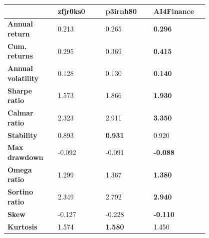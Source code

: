 \documentclass[../xlapes02]{subfiles}
\begin{document}
    \begin{table}[h!]
        \centering
        {\footnotesize
            \begin{tabular}{*{4}{|m{0.20\linewidth}|}}
                \toprule
                & \bfseries zfjr0ks0                   & \bfseries p3irnh80                    & \bfseries AI4Finance \\[0.5cm]
                \midrule
                \bfseries Annual return       & 0.213                                & 0.265                                 & \color[HTML]{00F000} \bfseries 0.296 \\[0.5cm]
                \bfseries Cum. returns        & 0.295                                & 0.369                                 & \color[HTML]{00F000} \bfseries 0.415 \\[0.5cm]
                \bfseries Annual volatility   & 0.128                                & 0.130                                 & \color[HTML]{00F000} \bfseries 0.140 \\[0.5cm]
                \bfseries Sharpe ratio        & 1.573                                & 1.866                                 & \color[HTML]{00F000} \bfseries 1.930 \\[0.5cm]
                \bfseries Calmar ratio        & 2.323                                & 2.911                                 & \color[HTML]{00F000} \bfseries 3.350 \\[0.5cm]
                \bfseries Stability           & 0.893                                & \color[HTML]{00F000} \bfseries 0.931  & 0.920 \\[0.5cm]
                \bfseries Max drawdown        & -0.092                               & -0.091                                & \color[HTML]{00F000} \bfseries -0.088 \\[0.5cm]
                \bfseries Omega ratio         & 1.299                                & 1.367                                 & \color[HTML]{00F000} \bfseries 1.380 \\[0.5cm]
                \bfseries Sortino ratio       & 2.349                                & 2.792                                 & \color[HTML]{00F000} \bfseries 2.940 \\[0.5cm]
                \bfseries Skew                & -0.127                               & -0.228                                & \color[HTML]{00F000} \bfseries -0.110 \\[0.5cm]
                \bfseries Kurtosis            & 1.574                                & \color[HTML]{00F000} \bfseries 1.580  & 1.450 \\[0.5cm]

\end{tabular}}
\end{table}
\end{document}
